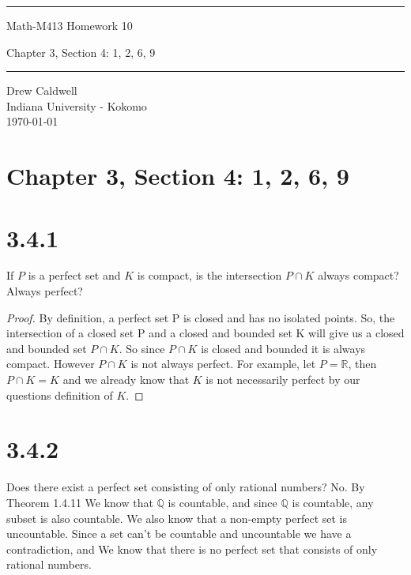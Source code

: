 \documentclass{article}
\begin{document}
\begin{titlepage}
\scshape
\centering
\raisebox{-\baselineskip}{\rule{\textwidth}{1px}}
\vspace{.3cm}
\rule{\textwidth}{.5px}
\vspace{.3cm}
{\huge{{Math-M413 Homework 10}}}\par \vspace{0.3cm}
Chapter 3, Section 4: 1, 2, 6, 9
\rule{\textwidth}{2px}

\large{Drew Caldwell}\\
\large{Indiana University - Kokomo}\\
\vspace{1.3cm}
\vfill
\today
\end{titlepage}

\section*{Chapter 3, Section 4: 1, 2, 6, 9}

\section*{3.4.1}
If $P$ is a perfect set and $K$ is compact, is the intersection $P \cap K$ always compact? Always perfect?

\begin{proof}
By definition, a perfect set P is closed and has no isolated points. So, the intersection of a closed set P and a closed and bounded set K will give us a closed and bounded set $P \cap K$. So since $P \cap K$ is closed and bounded it is always compact. However $P \cap K$ is not always perfect. For example, let $P = \mathbb{R}$, then $P \cap K = K$ and we already know that $K$ is not necessarily perfect by our questions definition of $K$.
\end{proof}

\section*{3.4.2}
Does there exist a perfect set consisting of only rational numbers?
\newline
\newline
No. By Theorem 1.4.11 We know that $\mathbb{Q}$ is countable, and since $\mathbb{Q}$ is countable, any subset is also countable. We also know that a non-empty perfect set is uncountable. Since a set can't be countable and uncountable we have a contradiction, and We know that there is no perfect set that consists of only rational numbers.
\end{document}
